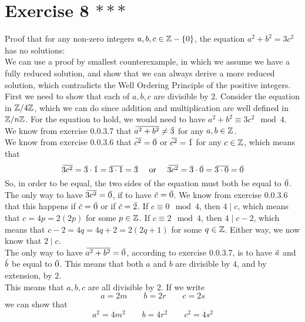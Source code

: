 \documentclass[12pt]{article}
\begin{document}
    \section*{Exercise 8 $***$}
    Proof that for any non-zero integers $a, b, c \in \mathbb{Z} - \{ 0 \}$, 
    the equation $a^2 + b^2 = 3c^2$ has no solutions: \\
    We can use a proof by smallest counterexample,
    in which we assume we have a fully reduced solution,
    and show that we can always derive a more reduced solution,
    which contradicts the Well Ordering Principle
    of the positive integers. \\
    First we need to show that each of $a, b, c$
    are divisible by $2$.
    Consider the equation in $\mathbb{Z}/4\mathbb{Z}$,
    which we can do since addition and multiplication are well defined
    in $\mathbb{Z}/n\mathbb{Z}$.
    For the equation to hold,
    we would need to have $a^2 + b^2 \equiv 3c^2 \mod 4$. \\
    We know from exercise 0.0.3.7
    that $\,\overline{\!{a^2 + b^2}} \neq \,\overline{\!{3}}$
    for any $a, b \in \mathbb{Z}$. \\
    We know from exercise 0.0.3.6 that $\,\overline{\!{c^2}} = \,\overline{\!{0}}$
    or $\,\overline{\!{c^2}} = \,\overline{\!{1}}$ for any $c \in \mathbb{Z}$,
    which means that
    \[ \olsi{3c^2} = \olsi{3} \cdot \olsi{1}
    = \olsi{3 \cdot 1} = \olsi{3} 
    \quad \text { or } \quad
    \olsi{3c^2} = \olsi{3} \cdot \olsi{0}
    = \olsi{3 \cdot 0} = \olsi{0} \]
    So, in order to be equal, the two sides of the equation must
    both be equal to $\,\overline{\!{0}}$. \\
    The only way to have $\,\overline{\!{3c^2}} = \,\overline{\!{0}}$,
    if to have $\,\overline{\!{c}} = \,\overline{\!{0}}$.
    We know from exercise 0.0.3.6 that this happens if
    $\,\overline{\!{c}} = \,\overline{\!{0}}$ or if $\,\overline{\!{c}} = \,\overline{\!{2}}$.
    If $c \equiv 0 \mod 4$,
    then $4 \mid c$, which means that $c = 4p = 2(2p)$
    for some $p \in \mathbb{Z}$.
    If $c \equiv 2 \mod 4$,
    then $4 \mid c - 2$, which means that $c - 2 = 4q = 4q + 2 = 2(2q + 1)$
    for some $q \in \mathbb{Z}$.
    Either way, we now know that $2 \mid c$. \\
    The only way to have $\,\overline{\!{a^2 + b^2}} = \,\overline{\!{0}}$,
    according to exercise 0.0.3.7,
    is to have $\,\overline{\!{a}}$ and $\,\overline{\!{b}}$ be equal to $\,\overline{\!{0}}$.
    This means that both $a$ and $b$ are divisible by $4$,
    and by extension, by $2$. \\
    This means that $a, b, c$ are all divisible by $2$.
    If we write
    \[ a = 2m \qquad b = 2r \qquad c = 2s \]
    we can show that
    \[ a^2 = 4m^2 \qquad b = 4r^2 \qquad c^2 = 4s^2 \]
\end{document}
